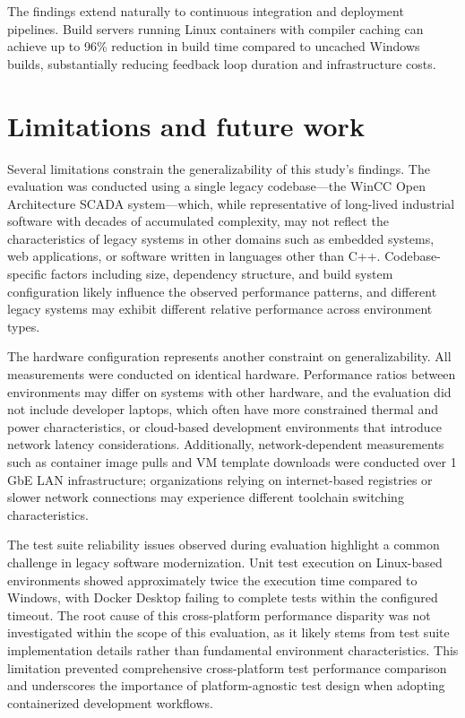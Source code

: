 The findings extend naturally to continuous integration and deployment pipelines.
Build servers running Linux containers with compiler caching can achieve up to 96\% reduction in build time compared to uncached Windows builds, substantially reducing feedback loop duration and infrastructure costs.

\section{Limitations and future work}

Several limitations constrain the generalizability of this study's findings.
The evaluation was conducted using a single legacy codebase---the WinCC Open Architecture SCADA system---which, while representative of long-lived industrial software with decades of accumulated complexity, may not reflect the characteristics of legacy systems in other domains such as embedded systems, web applications, or software written in languages other than C++.
Codebase-specific factors including size, dependency structure, and build system configuration likely influence the observed performance patterns, and different legacy systems may exhibit different relative performance across environment types.

The hardware configuration represents another constraint on generalizability.
All measurements were conducted on identical hardware.
Performance ratios between environments may differ on systems with other hardware, and the evaluation did not include developer laptops, which often have more constrained thermal and power characteristics, or cloud-based development environments that introduce network latency considerations.
Additionally, network-dependent measurements such as container image pulls and VM template downloads were conducted over 1 GbE LAN infrastructure; organizations relying on internet-based registries or slower network connections may experience different toolchain switching characteristics.

The test suite reliability issues observed during evaluation highlight a common challenge in legacy software modernization.
Unit test execution on Linux-based environments showed approximately twice the execution time compared to Windows, with Docker Desktop failing to complete tests within the configured timeout.
The root cause of this cross-platform performance disparity was not investigated within the scope of this evaluation, as it likely stems from test suite implementation details rather than fundamental environment characteristics.
This limitation prevented comprehensive cross-platform test performance comparison and underscores the importance of platform-agnostic test design when adopting containerized development workflows.

